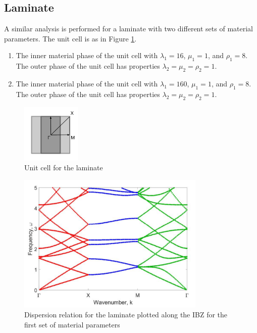 \documentclass{article}
\begin{document}
\subsection{Laminate}
A similar analysis is performed for a laminate with two different sets of 
material parameters. The unit cell is as in Figure \ref{fig:twodlayrdcell}.
\begin{enumerate}
	\item The inner material phase of the unit cell with 
	$\lambda_1 = 16$, $\mu_1 = 1$, and $\rho_1 = 8$. The outer phase of the 
	unit cell has properties $\lambda_2 = \mu_2 = \rho_2 = 1$.
	\item The inner material phase of the unit cell with 
	$\lambda_1 = 160$, $\mu_1 = 1$, and $\rho_1 = 8$. The outer phase of the 
	unit cell has properties $\lambda_2 = \mu_2 = \rho_2 = 1$.
\end{enumerate}
\begin{figure}[!htbp]
	\centering
	\includegraphics[width=0.25\textwidth]{twodlayrdcell.pdf}
	\caption{Unit cell for the laminate}
	\label{fig:twodlayrdcell}
\end{figure}
\begin{figure}[!htbp]
	\centering
	\includegraphics[width=0.8\textwidth]{twodlayrd16.pdf}
	\caption{Dispersion relation for the laminate plotted along the IBZ for the 
	first set of material parameters}
	\label{fig:twodlayrd16}
\end{figure}
\end{document}
